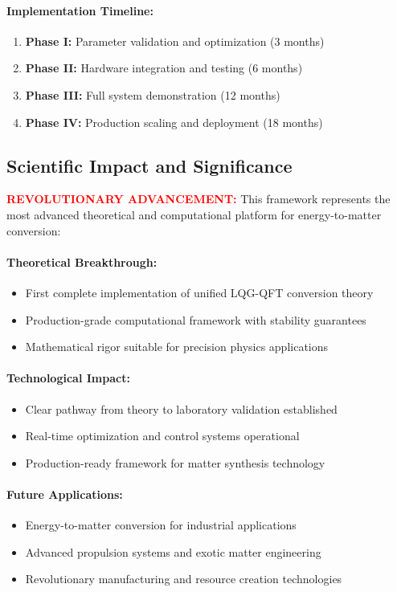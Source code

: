 \documentclass[11pt]{article}
\begin{document}
\paragraph{Implementation Timeline:}
\begin{enumerate}
  \item \textbf{Phase I:} Parameter validation and optimization (3 months)
  \item \textbf{Phase II:} Hardware integration and testing (6 months)
  \item \textbf{Phase III:} Full system demonstration (12 months)
  \item \textbf{Phase IV:} Production scaling and deployment (18 months)
\end{enumerate}

\subsection*{Scientific Impact and Significance}
\textcolor{red}{\textbf{REVOLUTIONARY ADVANCEMENT:}} This framework represents the most advanced theoretical and computational platform for energy-to-matter conversion:

\paragraph{Theoretical Breakthrough:}
\begin{itemize}
  \item First complete implementation of unified LQG-QFT conversion theory
  \item Production-grade computational framework with stability guarantees
  \item Mathematical rigor suitable for precision physics applications
\end{itemize}

\paragraph{Technological Impact:}
\begin{itemize}
  \item Clear pathway from theory to laboratory validation established
  \item Real-time optimization and control systems operational
  \item Production-ready framework for matter synthesis technology
\end{itemize}

\paragraph{Future Applications:}
\begin{itemize}
  \item Energy-to-matter conversion for industrial applications
  \item Advanced propulsion systems and exotic matter engineering
  \item Revolutionary manufacturing and resource creation technologies
\end{itemize}
\end{document}
